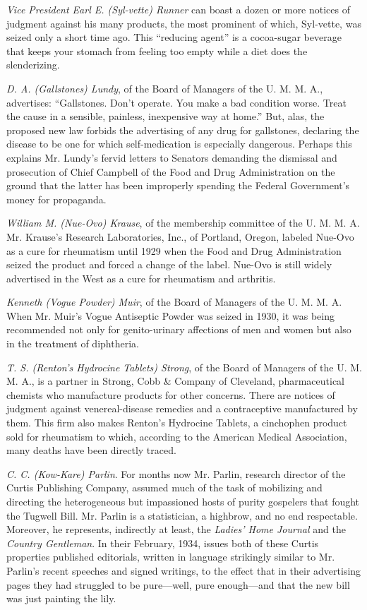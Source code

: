 \documentclass[openany,nobib]{tufte-book}
\begin{document}
\emph{Vice President Earl E. (Syl-vette) Runner} can boast a dozen or
more notices of judgment against his many products, the most prominent
of which, Syl-vette, was seized only a short time ago. This ``reducing
agent'' is a cocoa-sugar beverage that keeps your stomach from feeling
too empty while a diet does the slenderizing.

\emph{D. A. (Gallstones) Lundy}, of the Board of Managers of the U. M.
M. A., advertises: ``Gallstones. Don't operate. You make a bad condition
worse. Treat the cause in a sensible, painless, inexpensive way at
home.'' But, alas, the proposed new law forbids the advertising of any
drug for gallstones, declaring the disease to be one for which
self-medication is especially dangerous. Perhaps this explains Mr.
Lundy's fervid letters to Senators demanding the dismissal and
prosecution of Chief Campbell of the Food and Drug Administration on the
ground that the latter has been improperly spending the Federal
Government's money for propaganda.

\emph{William M. (Nue-Ovo) Krause}, of the membership committee of the
U. M. M. A. Mr. Krause's Research Laboratories, Inc., of Portland,
Oregon, labeled Nue-Ovo as a cure for rheumatism until 1929 when the
Food and Drug Administration seized the product and forced a change of
the label. Nue-Ovo is still widely advertised in the West as a cure for
rheumatism and arthritis.

\emph{Kenneth (Vogue Powder) Muir}, of the Board of Managers of the U.
M. M. A. When Mr. Muir's Vogue Antiseptic Powder was seized in 1930, it
was being recommended not only for genito-urinary affections of men and
women but also in the treatment of diphtheria.

\emph{T. S. (Renton's Hydrocine Tablets) Strong}, of the Board of
Managers of the U. M. M. A., is a partner in Strong, Cobb \& Company of
Cleveland, pharmaceutical chemists who manufacture products for other
concerns. There are notices of judgment against venereal-disease
remedies and a contraceptive manufactured by them. This firm also makes
Renton's Hydrocine Tablets, a cinchophen product sold for rheumatism to
which, according to the American Medical Association, many deaths have
been directly traced.

\emph{C. C. (Kow-Kare) Parlin}. For months now Mr. Parlin, research
director of the Curtis Publishing Company, assumed much of the task of
mobilizing and directing the heterogeneous but impassioned hosts of
purity gospelers that fought the Tugwell Bill. Mr. Parlin is a
statistician, a highbrow, and no end respectable. Moreover, he
represents, indirectly at least, the \emph{Ladies' Home Journal} and the
\emph{Country Gentleman}. In their February, 1934, issues both of these
Curtis properties published editorials, written in language strikingly
similar to Mr. Parlin's recent speeches and signed writings, to the
effect that in their advertising pages they had struggled to be
pure---well, pure enough---and that the new bill was just painting the
lily.
\end{document}
